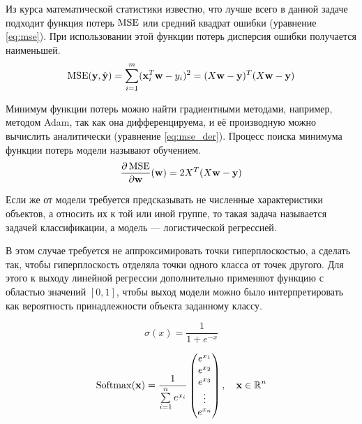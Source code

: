 Из курса математической статистики известно, что лучше всего в данной задаче подходит функция потерь $\operatorname{MSE}$ или средний квадрат ошибки (уравнение \ref*{eq:mse}). При использовании этой функции потерь дисперсия ошибки получается наименьшей.
\begin{equation}
    \label{eq:mse}
    \operatorname{MSE}(\mathbf{y},\hat{\mathbf{y}})=\sum\limits_{i=1}^m(\mathbf{x}_i^T\mathbf{w}-y_i)^2=(X\mathbf{w}-\mathbf{y})^T(X\mathbf{w}-\mathbf{y})
\end{equation}

Минимум функции потерь можно найти градиентными методами, например, методом Adam, так как она дифференцируема, и её производную можно вычислить аналитически (уравнение \ref*{eq:mse_der}). Процесс поиска минимума функции потерь модели называют обучением.
\begin{equation}
    \label{eq:mse_der}
    \frac{\partial\operatorname{MSE}}{\partial \mathbf{w}}(\mathbf{w})=2X^T(X\mathbf{w}-\mathbf{y})
\end{equation}

Если же от модели требуется предсказывать не численные характеристики объектов, а относить их к той или иной группе, то такая задача называется задачей классификации, а модель --- логистической регрессией.

В этом случае требуется не аппроксимировать точки гиперплоскостью, а сделать так, чтобы гиперплоскость отделяла точки одного класса от точек другого. Для этого к выходу линейной регрессии дополнительно применяют функцию с областью значений $[0, 1]$, чтобы выход модели можно было интерпретировать как вероятность принадлежности объекта заданному классу.

\begin{equation}
    \label{eq:sigmoid}
    \sigma(x)=\frac{1}{1+e^{-x}}
\end{equation}

\begin{equation}
    \label{eq:softmax}
    \operatorname{Softmax}(\mathbf{x})=\frac{1}{\sum\limits_{i=1}^n e^{x_i}}
    \left(\begin{matrix}
        e^{x_1} \\
        e^{x_2} \\
        e^{x_3} \\
        \vdots \\
        e^{x_n}
    \end{matrix}\right),\quad \mathbf{x}\in \operatorname{\mathbb{R}}^n
\end{equation}

